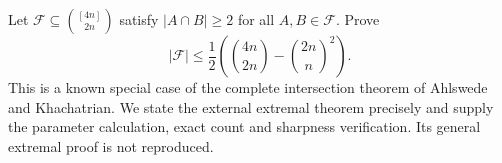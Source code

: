 Let $\mathcal F\subseteq\binom{[4n]}{2n}$ satisfy
$|A\cap B|\geq2$ for all $A,B\in\mathcal F$. Prove
\[
 |\mathcal F|\leq\frac12\left(\binom{4n}{2n}-\binom{2n}{n}^2\right).
\]
This is a known special case of the complete intersection theorem
of Ahlswede and Khachatrian. We state the external extremal theorem
precisely and supply the parameter calculation, exact count and
sharpness verification. Its general extremal proof is not reproduced.
